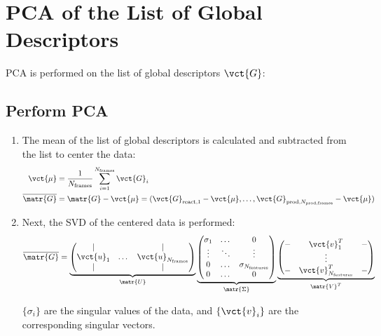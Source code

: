 \section{PCA of the List of Global Descriptors}
\label{sec:pca_analysis}
PCA is performed on the list of global descriptors $\vct{G}$:
\subsection{Perform PCA}
\begin{enumerate}
    \item The mean of the list of global descriptors is calculated and subtracted from the list to center the data:
    \begin{align}
    \vct{\mu} &= \frac{1}{N_{\text{frames}}} \sum_{i=1}^{N_{\text{frames}}} \vct{G}_{i}  \\
    \overline{\matr{G}} &= \matr{G} - \vct{\mu} = ( \vct{G}_{\text{react},1} - \vct{\mu}, \dots, \vct{G}_{\text{prod},N_{\text{prod,frames}}} - \vct{\mu} ) 
    \end{align}
    \item Next, the SVD of the centered data is performed:
    \begin{align}
    \overline{\matr{G}} = 
    \underbrace{
    \begin{pmatrix}
        | & & | \\
        \vct{u}_1 & \dots & \vct{u}_{N_{\text{frames}}} \\
        | & & |
    \end{pmatrix}
    }_{\matr{U}}
    \underbrace{
    \begin{pmatrix}
        \sigma_1  & \dots & 0 \\
        \vdots  & \ddots & \vdots \\
        0  & \dots & \sigma_{N_{\text{features}}} \\
        0  & \dots & 0
    \end{pmatrix}
    }_{\matr{\Sigma}}
    \underbrace{
    \begin{pmatrix}
        - & \vct{v}_1^T & - \\
        & \vdots & \\
        - & \vct{v}_{N_{\text{features}}}^T & -
    \end{pmatrix}
    }_{\matr{V}^T}
    \end{align}

    $\{\sigma_i\}$ are the singular values of the data, and $\{\vct{v}_i\}$ are the corresponding singular vectors.


\end{enumerate}
